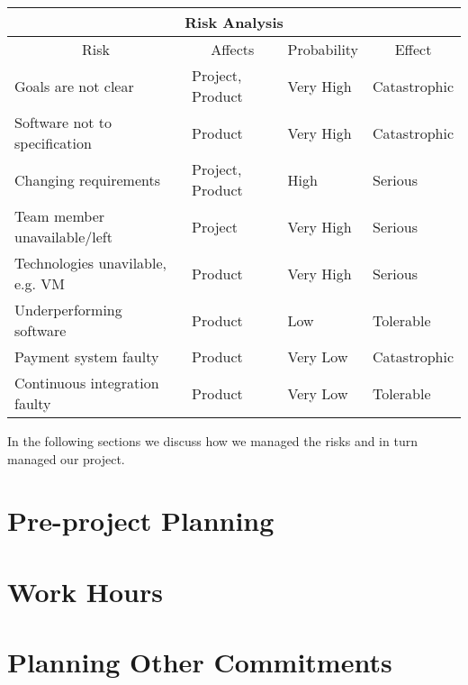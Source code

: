 \begin{center}

\begin{longtable}{ |p{5.7cm}|p{2cm}|p{2.2cm}|p{2.7cm}|  }

 \hline
 	\multicolumn{4}{|c|}{Risk Analysis} \\
 \hline
 	\multicolumn{1}{|c|}{Risk} &
 	\multicolumn{1}{|c|}{Affects} &
 	\multicolumn{1}{|c|}{Probability} &
 	\multicolumn{1}{|c|}{Effect}  \\
  \hline
 	 Goals are not clear & Project, Product & Very High & Catastrophic \\
   \hline
   Software not to specification & Product & Very High & Catastrophic \\
   \hline
   Changing requirements & Project, Product & High & Serious \\
  \hline
  Team member unavailable/left & Project & Very High & Serious \\
  \hline
  Technologies unavilable, e.g. VM & Product & Very High & Serious \\
  \hline
  Underperforming software & Product & Low & Tolerable \\
  \hline
  Payment system faulty & Product & Very Low & Catastrophic \\
  \hline
  Continuous integration faulty & Product & Very Low & Tolerable \\
  \hline

\end{longtable}

\label{tab:risk}

\end{center}

In the following sections we discuss how we managed the risks and in turn managed our project.

\section{Pre-project Planning}
\label{sec:pre-project-planning}

\section{Work Hours}
\label{sec:work-hours}

\section{Planning Other Commitments}
\label{sec:planning-other-commitments}

